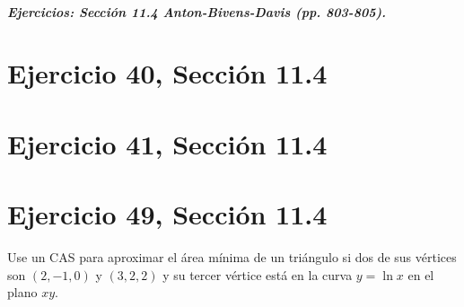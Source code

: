 \documentclass[11pt,letterpaper]{article}
\begin{document}
\subparagraph{Ejercicios: Sección 11.4 Anton-Bivens-Davis (pp. 803-805).}

\section{Ejercicio 40, Sección 11.4}

\section{Ejercicio 41, Sección 11.4}

\section{Ejercicio 49, Sección 11.4}
Use un CAS para aproximar el área mínima de un triángulo si dos de sus vértices son $(2, -1, 0)$ y $(3, 2, 2)$ y su tercer vértice está en la curva $y = \ln x$ en el plano $xy$.
\end{document}
